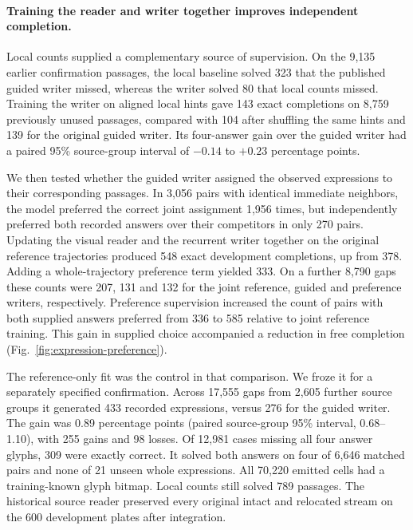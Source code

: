 \paragraph{Training the reader and writer together improves independent completion.}
Local counts supplied a complementary source of supervision. On the 9,135 earlier confirmation passages, the local baseline solved 323 that the published guided writer missed, whereas the writer solved 80 that local counts missed. Training the writer on aligned local hints gave 143 exact completions on 8,759 previously unused passages, compared with 104 after shuffling the same hints and 139 for the original guided writer. Its four-answer gain over the guided writer had a paired 95\% source-group interval of $-0.14$ to $+0.23$ percentage points.

We then tested whether the guided writer assigned the observed expressions to their corresponding passages. In 3,056 pairs with identical immediate neighbors, the model preferred the correct joint assignment 1,956 times, but independently preferred both recorded answers over their competitors in only 270 pairs. Updating the visual reader and the recurrent writer together on the original reference trajectories produced 548 exact development completions, up from 378. Adding a whole-trajectory preference term yielded 333. On a further 8,790 gaps these counts were 207, 131 and 132 for the joint reference, guided and preference writers, respectively. Preference supervision increased the count of pairs with both supplied answers preferred from 336 to 585 relative to joint reference training. This gain in supplied choice accompanied a reduction in free completion (Fig.~\ref{fig:expression-preference}).

The reference-only fit was the control in that comparison. We froze it for a separately specified confirmation. Across 17,555 gaps from 2,605 further source groups it generated 433 recorded expressions, versus 276 for the guided writer. The gain was 0.89 percentage points (paired source-group 95\% interval, 0.68--1.10), with 255 gains and 98 losses. Of 12,981 cases missing all four answer glyphs, 309 were exactly correct. It solved both answers on four of 6,646 matched pairs and none of 21 unseen whole expressions. All 70,220 emitted cells had a training-known glyph bitmap. Local counts still solved 789 passages. The historical source reader preserved every original intact and relocated stream on the 600 development plates after integration.
